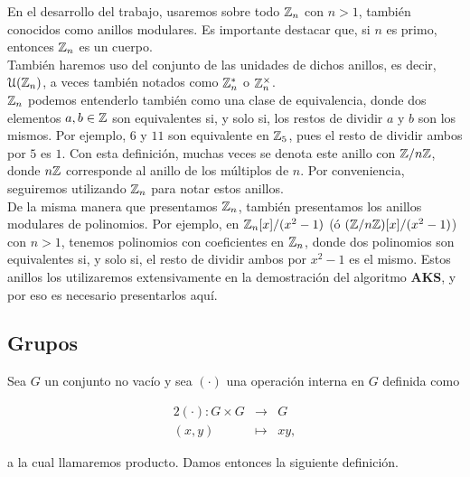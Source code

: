 En el desarrollo del trabajo, usaremos sobre todo $\mathbb{Z}_n$ con $n > 1$, también conocidos como anillos modulares. Es importante destacar que, si $n$ es primo, entonces $\mathbb{Z}_n$ es un cuerpo.\\

También haremos uso del conjunto de las unidades de dichos anillos, es decir, $\mathcal{U}(\mathbb{Z}_n)$, a veces también notados como $\mathbb{Z}_n^*$ o $\mathbb{Z}_n^\times$.\\

$\mathbb{Z}_n$ podemos entenderlo también como una clase de equivalencia, donde dos elementos $a, b \in \mathbb{Z}$ son equivalentes si, y solo si, los restos de dividir $a$ y $b$ son los mismos. Por ejemplo, $6$ y $11$ son equivalente en $\mathbb{Z}_5$, pues el resto de dividir ambos por $5$ es $1$. Con esta definición, muchas veces se denota este anillo con $\mathbb{Z} / n\mathbb{Z}$, donde $n\mathbb{Z}$ corresponde al anillo de los múltiplos de $n$. Por conveniencia, seguiremos utilizando $\mathbb{Z}_n$ para notar estos anillos.\\

De la misma manera que presentamos $\mathbb{Z}_n$, también presentamos los anillos modulares de polinomios. Por ejemplo, en $\mathbb{Z}_n[x] / (x^2 - 1)$ (ó $(\mathbb{Z}/n\mathbb{Z})[x]/(x^2 - 1)$) con $n > 1$, tenemos polinomios con coeficientes en $\mathbb{Z}_n$, donde dos polinomios son equivalentes si, y solo si, el resto de dividir ambos por $x^2 - 1$ es el mismo. Estos anillos los utilizaremos extensivamente en la demostración del algoritmo \textbf{AKS}, y por eso es necesario presentarlos aquí.

\subsection{Grupos}

Sea $G$ un conjunto no vacío y sea $(\cdot)$ una operación interna en $G$ definida como

\begin{alignat*}{2}
	(\cdot): G \times G & \to & G \\
	(x, y) & \mapsto & xy,
\end{alignat*}

a la cual llamaremos producto. Damos entonces la siguiente definición.

